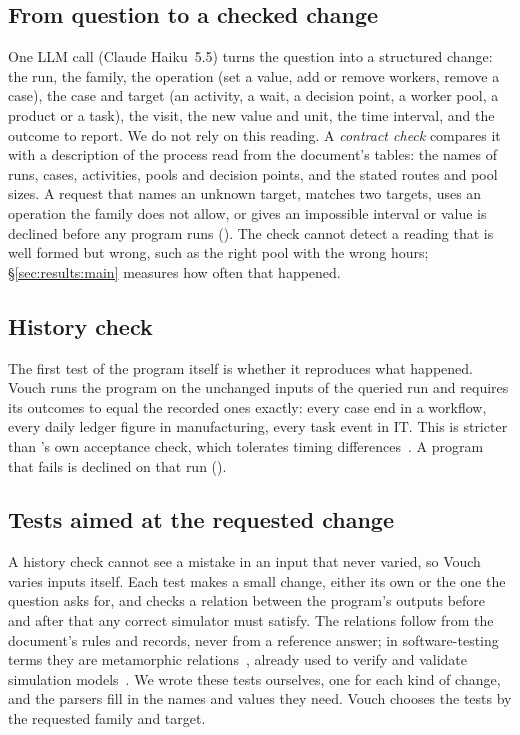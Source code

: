 \subsection{From question to a checked change}
\label{sec:method:request}

One LLM call (Claude Haiku~5.5) turns the question into a structured change: the run, the family, the operation (set a value, add or remove workers, remove a case), the case and target (an activity, a wait, a decision point, a worker pool, a product or a task), the visit, the new value and unit, the time interval, and the outcome to report. We do not rely on this reading. A \emph{contract check} compares it with a description of the process read from the document's tables: the names of runs, cases, activities, pools and decision points, and the stated routes and pool sizes. A request that names an unknown target, matches two targets, uses an operation the family does not allow, or gives an impossible interval or value is declined before any program runs (\Badrequest). The check cannot detect a reading that is well formed but wrong, such as the right pool with the wrong hours; \S\ref{sec:results:main} measures how often that happened.

\subsection{History check}
\label{sec:method:history}

The first test of the program itself is whether it reproduces what happened. Vouch runs the program on the unchanged inputs of the queried run and requires its outcomes to equal the recorded ones exactly: every case end in a workflow, every daily ledger figure in manufacturing, every task event in IT. This is stricter than \otf's own acceptance check, which tolerates timing differences~\cite{otftools2026}. A program that fails is declined on that run (\Failhist).

\subsection{Tests aimed at the requested change}
\label{sec:method:probes}

A history check cannot see a mistake in an input that never varied, so Vouch varies inputs itself. Each test makes a small change, either its own or the one the question asks for, and checks a relation between the program's outputs before and after that any correct simulator must satisfy. The relations follow from the document's rules and records, never from a reference answer; in software-testing terms they are metamorphic relations~\cite{chen2018metamorphic,segura2016survey}, already used to verify and validate simulation models~\cite{raunak2021metamorphic}. We wrote these tests ourselves, one for each kind of change, and the parsers fill in the names and values they need. Vouch chooses the tests by the requested family and target.


